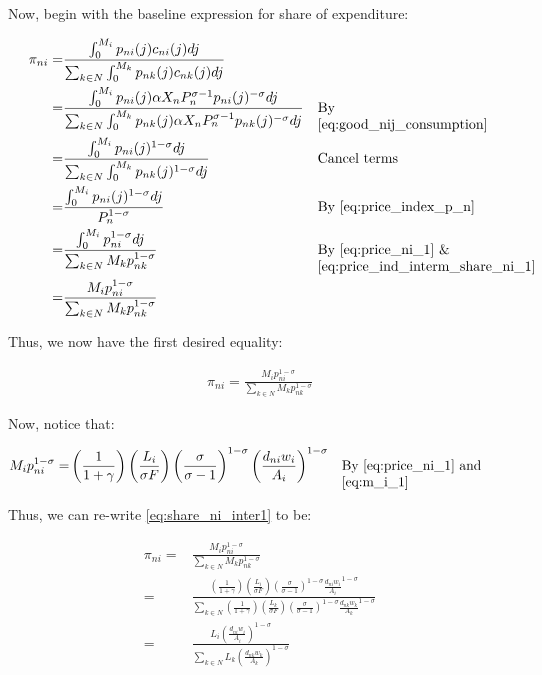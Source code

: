 \documentclass[10pt]{article}
\begin{document}
Now, begin with the baseline expression
for share of expenditure:

\begin{align}
    \pi_{n i}=&\frac{\int_0^{M_i} p_{n i}(j) c_{n i}(j) d j}{\sum_{k \in N} \int_0^{M_k} p_{n k}(j) c_{n k}(j) d j} \\
    = &\frac{\int_0^{M_i} p_{n i}(j) \alpha X_n P_n^{\sigma-1} p_{n i}(j)^{-\sigma} d j}{\sum_{k \in N} \int_0^{M_k} p_{n k}(j) \alpha X_n P_n^{\sigma-1} p_{n k}(j)^{-\sigma} d j} && \parbox[t]{4cm}{\raggedright By \eqref{eq:good_nij_consumption}} \\
    = &\frac{\int_0^{M_i} p_{ni}(j)^{1-\sigma} d j}{\sum_{k \in N} \int_0^{M_k} p_{nk}(j)^{1-\sigma} d j} && \parbox[t]{4cm}{\raggedright Cancel terms} \\
    = &\frac{\int_0^{M_i} p_{ni}(j)^{1-\sigma} d j}{P_n^{1-\sigma}} && \parbox[t]{4cm}{\raggedright By \eqref{eq:price_index_p_n}} \\
    = &\frac{\int_0^{M_i} p_{ni}^{1-\sigma} d j}{\sum_{k \in N} M_k p_{nk}^{1-\sigma}} && \parbox[t]{4cm}{\raggedright By \eqref{eq:price_ni_1} \& \eqref{eq:price_ind_interm_share_ni_1}} \\
    = &\frac{M_i p_{ni}^{1-\sigma}}{\sum_{k \in N} M_k p_{nk}^{1-\sigma}}
\end{align}

Thus, we now have the first desired equality:

\begin{align}
    \pi_{n i}=\frac{M_i p_{n i}^{1-\sigma}}{\sum_{k \in N} M_k p_{n k}^{1-\sigma}} \label{eq:share_ni_inter1}
\end{align}

Now, notice that:

\begin{align}
    M_i p_{ni}^{1-\sigma} = &\left(\frac{1}{1 + \gamma}\right)\left(\frac{L_i}{\sigma F}\right) \left(\frac{\sigma}{\sigma-1}\right)^{1-\sigma} \left(\frac{d_{ni} w_i}{A_i}\right)^{1-\sigma} && \parbox[t]{4cm}{\raggedright By \eqref{eq:price_ni_1} and \eqref{eq:m_i_1}}
\end{align}

Thus, we can re-write \eqref{eq:share_ni_inter1} to be: 

\begin{align}
    \pi_{n i}=&\frac{M_i p_{n i}^{1-\sigma}}{\sum_{k \in N} M_k p_{n k}^{1-\sigma}} \\
    = &\frac{\left(\frac{1}{1 + \gamma}\right)\left(\frac{L_i}{\sigma F}\right) \left(\frac{\sigma}{\sigma-1}\right)^{1-\sigma} \frac{d_{ni} w_i}{A_i}^{1-\sigma}}{\sum_{k \in N} \left(\frac{1}{1 + \gamma}\right)\left(\frac{L_k}{\sigma F}\right) \left(\frac{\sigma}{\sigma-1}\right)^{1-\sigma} \frac{d_{nk} w_k}{A_k}^{1-\sigma}} \\
    = &\frac{L_i \left(\frac{d_{ni} w_i}{A_i}\right)^{1-\sigma}}{\sum_{k \in N} L_k \left(\frac{d_{nk} w_k}{A_k}\right)^{1-\sigma}}
\end{align}
\end{document}
